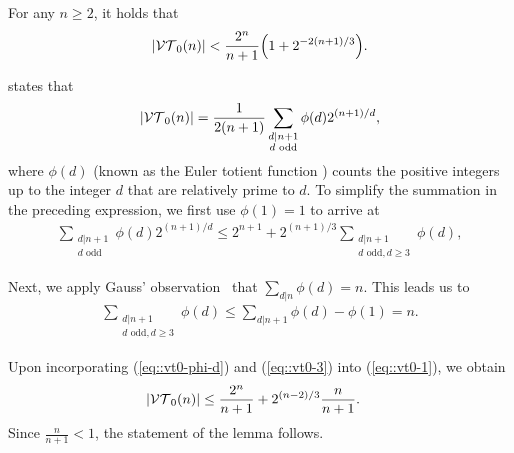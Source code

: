 \begin{lemma} \label{lem::vt0-code-upper-bound}
    For any $n \geq 2$, it holds that
    \begin{equation*}
        |\vt{0}{n}| < \frac{2^n}{n+1} \parenv*{1+2^{-2(n+1)/3}}.
    \end{equation*}
\end{lemma}
\begin{IEEEproof}
 \cite[Corollary~2.3]{sloaneSingleDeletionCorrectingCodes2002} states that
    \begin{align}
        |\mathcal{VT}_{0}(n)| = \frac{1}{2(n+1)} \sum_{\substack{d|n+1 \\ d \text{ odd}}} \phi(d)2^{(n+1)/d}, \label{eq::vt0-1}
    \end{align}
    where $\phi(d)$ (known as the Euler totient function \cite{EulersTotientFunction2026}) counts the positive integers up to the integer $d$ that are relatively prime to $d$. To simplify the summation in the preceding expression, we first use $\phi(1) = 1$ to arrive at
    \begin{align}
        \sum_{\substack{d|n+1 \\ d \text{ odd}}} \phi(d)2^{(n+1)/d}\leq 2^{n+1} + 2^{(n+1)/3}\sum_{\substack{d|n+1 \\ d \text{ odd}, d \geq 3}} \!\!\!\! \phi(d), \label{eq::vt0-phi-d}
    \end{align}
    
    Next, we apply Gauss' observation~\cite{gauss1801disquisitiones} that ${\sum_{d|n} \phi(d) =n}$. This leads us to
    \begin{align}
        \sum_{\substack{d|n+1 \\ d \text{ odd}, d \geq 3}} \phi(d) \leq \sum_{d|n+1} \phi(d) - \phi(1) = n. \label{eq::vt0-3}
    \end{align}
        
    Upon incorporating (\ref{eq::vt0-phi-d}) and (\ref{eq::vt0-3}) into (\ref{eq::vt0-1}), we obtain
    \begin{align*}
        |\mathcal{VT}_{0}(n)| &\leq \frac{2^{n}}{n+1}  + 2^{(n-2)/3} \frac{n}{n+1}.
    \end{align*}
    Since $\tfrac{n}{n+1} < 1$, the statement of the lemma follows.
\end{IEEEproof}




